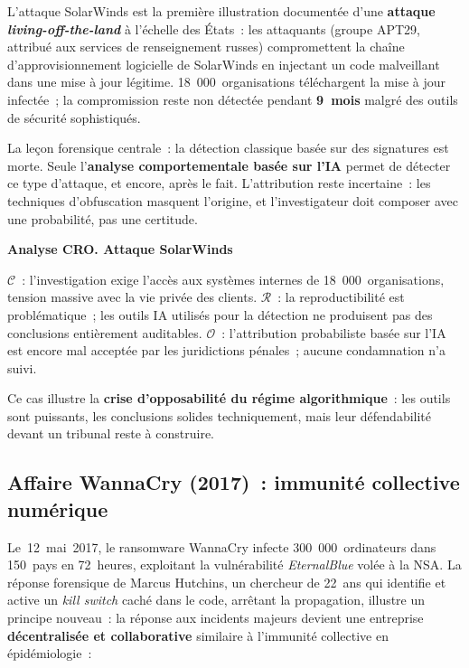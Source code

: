 L'attaque SolarWinds est la première illustration documentée d'une
\textbf{attaque \textit{living-off-the-land}} à l'échelle des États~:
les attaquants (groupe APT29, attribué aux services de renseignement russes)
compromettent la chaîne d'approvisionnement logicielle de SolarWinds en
injectant un code malveillant dans une mise à jour légitime. 18~000~organisations
téléchargent la mise à jour infectée~; la compromission reste non détectée
pendant \textbf{9~mois} malgré des outils de sécurité sophistiqués.

\medskip

La leçon forensique centrale~: la détection classique basée sur des signatures
est morte. Seule l'\textbf{analyse comportementale basée sur l'IA} permet
de détecter ce type d'attaque, et encore, après le fait. L'attribution
reste incertaine~: les techniques d'obfuscation masquent l'origine, et
l'investigateur doit composer avec une probabilité, pas une certitude.

\begin{boxCRO}
\textbf{Analyse CRO. Attaque SolarWinds}

$\mathcal{C}$~: l'investigation exige l'accès aux systèmes internes de
18~000~organisations, tension massive avec la vie privée des clients.
$\mathcal{R}$~: la reproductibilité est problématique~; les outils IA
utilisés pour la détection ne produisent pas des conclusions entièrement
auditables. $\mathcal{O}$~: l'attribution probabiliste basée sur l'IA
est encore mal acceptée par les juridictions pénales~; aucune condamnation
n'a suivi. 

Ce cas illustre la \textbf{crise d'opposabilité du régime algorithmique}~:
les outils sont puissants, les conclusions solides techniquement, mais leur
défendabilité devant un tribunal reste à construire.
\end{boxCRO}

\subsection{Affaire WannaCry (2017)~: immunité collective numérique}

Le~12~mai~2017, le ransomware WannaCry infecte 300~000~ordinateurs dans
150~pays en 72~heures, exploitant la vulnérabilité \textit{EternalBlue}
volée à la NSA. La réponse forensique de Marcus Hutchins, un chercheur
de 22~ans qui identifie et active un \textit{kill switch} caché dans le code,
arrêtant la propagation, illustre un principe nouveau~: la réponse aux
incidents majeurs devient une entreprise \textbf{décentralisée et collaborative}
similaire à l'immunité collective en épidémiologie~:

